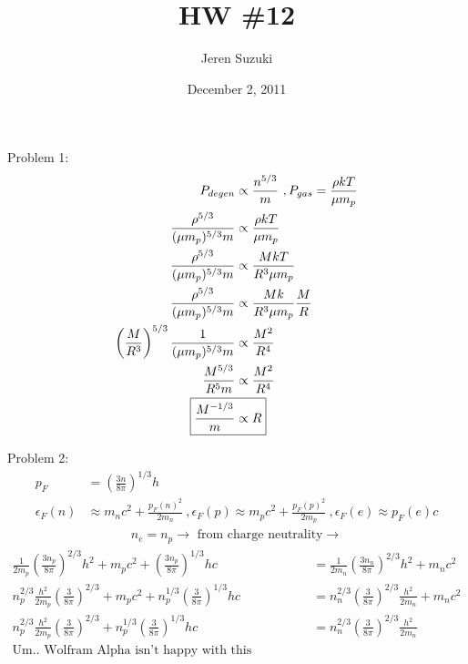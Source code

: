 \documentclass[10pt,letter,preprint]{aastex}
\newcommand{\pt}{\propto}
\newcommand{\rp}{\right)}
\newcommand{\lp}{\left(}
\begin{document}
\title{HW \#12}
\author{\begin{large}Jeren Suzuki\end{large}}
\author{December 2, 2011}

Problem 1:\\
\begin{align}
P_{degen} &\pt \frac{n^{5/3}}{m} ~, P_{gas} = \frac{\rho kT}{\mu m_{p}}\\
 \frac{\rho^{5/3}}{(\mu m_{p})^{5/3}m}  &\pt \frac{\rho kT}{\mu m_{p}}\\
 \frac{\rho^{5/3}}{(\mu m_{p})^{5/3}m}  &\pt \frac{M kT}{R^{3 }\mu m_{p}}\\
 \frac{\rho^{5/3}}{(\mu m_{p})^{5/3}m}  &\pt \frac{M k}{R^{3 }\mu m_{p}}\frac{M}{R}\\
\lp \frac{M}{R^{3}} \rp^{5/3} \frac{1}{(\mu m_{p})^{5/3}m} &\pt \frac{M^{2}}{R^{4}}\\
\frac{M^{5/3}}{R^{5}m} &\pt \frac{M^{2}}{R^{4}}\\
\Aboxed{\frac{M^{{-1/3}}}{m} &\pt R}
\end{align}

Problem 2:\\
\begin{align}
p_{F} &= \lp \frac{3n}{8\pi} \rp^{1/3}h\\
\epsilon_{F}(n) &\approx m_{n}c^{2} + \frac{p_{F}(n)^{2}}{2m_{n}}~, \epsilon_{F}(p) \approx m_{p}c^{2} + \frac{p_{F}(p)^{2}}{2m_{p}}~, \epsilon_{F}(e) \approx p_{F}(e)c
\end{align}
\begin{align}
n_{e} = n_{p} \rightarrow \textrm{ from charge neutrality} \rightarrow
\end{align}
\begin{align}
\frac{1}{2m_{p}} \lp \frac{3n_{p}}{8\pi} \rp^{2/3} h^{2} + m_{p}c^{2} + \lp \frac{3n_{p}}{8\pi} \rp^{1/3}hc &= \frac{1}{2m_{n}} \lp \frac{3n_{n}}{8\pi} \rp^{2/3} h^{2} + m_{n}c^{2}\\
n_{p}^{2/3} \frac{h^{2}}{2m_{p}}  \lp \frac{3}{8\pi} \rp^{2/3}  +m_{p}c^{2}+ n_{p}^{1/3}  \lp \frac{3}{8\pi} \rp^{1/3} hc &=  n_{n}^{2/3} \lp \frac{3}{8\pi} \rp^{2/3} \frac{h^{2}}{2m_{n}}  + m_{n}c^{2}\\
%
%
n_{p}^{2/3} \frac{h^{2}}{2m_{p}}  \lp \frac{3}{8\pi} \rp^{2/3} + n_{p}^{1/3}  \lp \frac{3}{8\pi} \rp^{1/3} hc &=  n_{n}^{2/3} \lp \frac{3}{8\pi} \rp^{2/3} \frac{h^{2}}{2m_{n}} \\
\textrm{Um.. Wolfram Alpha isn't happy with this equation}
\end{align}
\end{document}
